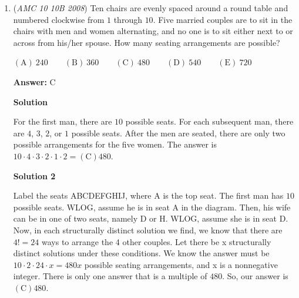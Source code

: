 \begin{enumerate}
 \textbf{Case 3 - the first dice is 3:} the outcome of the second dice can be $4$ or $6$. There is a $\frac{1}{3}$ probability of rolling a $3$ with the first dice and a $\frac{1}{3}$ probability of rolling a $4$ or $6$ with the second dice. $\frac{1}{3}*\frac{1}{3} = \frac{1}{9}.$

 \textbf{Case 4 - the first dice is 4:} the outcome of the second dice can be $1$, $3$, or $5$. There is a $\frac{1}{6}$ probability of rolling a $4$ with the first dice and a $\frac{1}{2}$ probability of rolling a $1$, $3$, or $5$ with the second dice. $\frac{1}{6}*\frac{1}{2} = \frac{1}{12}.$
$\frac{1}{12} + \frac{1}{9} + \frac{1}{9} + \frac{1}{12} = \frac{14}{36} = \frac{7}{18}$, so the answer is $\boxed{\textbf{(B) } \frac{7}{18}}$. ~azc1027

 Note: the problem where this is linked is covered 2:25-3:00

 


	\item (\textit{AMC 10 10B 2008}) Ten chairs are evenly spaced around a round table  and numbered clockwise from $1$ through $10$. Five married couples are to sit in the chairs with men and women alternating, and no one is to sit either next to or across from his/her spouse. How many seating arrangements are possible?


 $\mathrm{(A)}\ 240\qquad\mathrm{(B)}\ 360\qquad\mathrm{(C)}\ 480\qquad\mathrm{(D)}\ 540\qquad\mathrm{(E)}\ 720$

 \textbf{Answer: }C



\textbf{Solution}

For the first man, there are $10$ possible seats. For each subsequent man, there are $4$, $3$, $2$, or $1$ possible seats. After the men are seated, there are only two possible arrangements for the five women. The answer is $10\cdot 4\cdot 3\cdot 2\cdot 1\cdot 2 = \boxed{(\text{C}) 480}$.

 



\textbf{Solution 2}

Label the seats ABCDEFGHIJ, where A is the top seat. The first man has $10$ possible seats. WLOG, assume he is in seat A in the diagram. Then, his wife can be in one of two seats, namely D or H. WLOG, assume she is in seat D. Now, in each structurally distinct solution we find, we know that there are $4! = 24$ ways to arrange the 4 other couples. Let there be x structurally distinct solutions under these conditions. We know the answer must be $10\cdot 2\cdot 24\cdot x = 480x$ possible seating arrangements, and x is a nonnegative integer. There is only one answer that is a multiple of $480$. So, our answer is $\boxed{(\text{C}) 480}$.


\end{enumerate}
